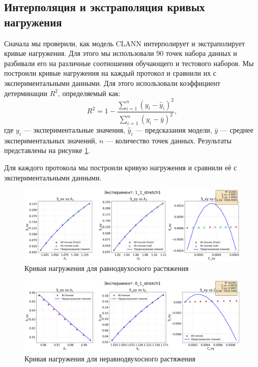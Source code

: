 \subsection{Интерполяция и экстраполяция кривых нагружения}
  Сначала мы проверили, как модель CLANN интерполирует и экстраполирует кривые нагружения.
  Для этого мы использовали 90 точек набора данных и разбивали его на различные соотношения обучающего и тестового наборов.
  Мы построили кривые нагружения на каждый протокол и сравнили их с экспериментальными данными.
  Для этого использовали коэффициент детерминации $R^2$, определяемый как:
  \begin{equation}
  R^2 = 1 - \frac{\sum_{i=1}^n (y_i - \hat{y}_i)^2}{\sum_{i=1}^n (y_i - \bar{y})^2},
  \label{eq:r_squared}
  \end{equation}
  где $y_i$ — экспериментальные значения, $\hat{y}_i$ — предсказания модели, $\bar{y}$ — среднее экспериментальных значений, $n$ — количество точек данных.
  Результаты представлены на рисунке \ref{fig:interpolation}.

  Для каждого протокола мы построили кривую нагружения и сравнили её с экспериментальными данными.
  
  \begin{figure}[H]
    \centering
    \includegraphics[width=1.0\textwidth]{img/interpolation.png}
    \caption{Кривая нагружения для равнодвухосного растяжения}
    \label{fig:interpolation}
  \end{figure}
  
  \begin{figure}[H]
    \centering
    \includegraphics[width=1.0\textwidth]{img/extrapolation.png}
    \caption{Кривая нагружения для неравнодвухосного растяжения}
    \label{fig:extrapolation}
  \end{figure}
   
